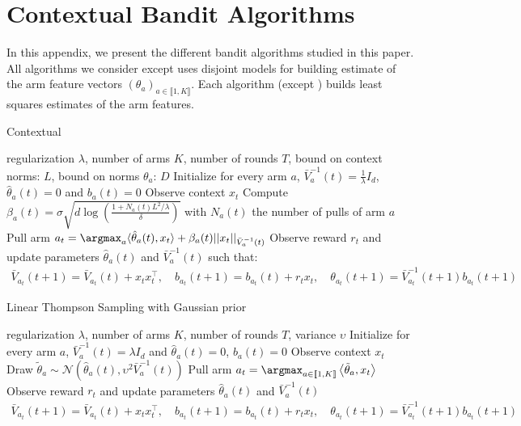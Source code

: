 \section{Contextual Bandit Algorithms}\label{app:algorithms}

In this appendix, we present the different bandit algorithms studied in this paper. All algorithms we consider except \expfour uses disjoint models for building estimate of the arm feature vectors $(\theta_{a})_{a\in\llbracket 1, K\rrbracket}$. Each algorithm (except \expfour) builds least squares estimates of the arm features.

\begin{algorithm}[h]
  \caption{Contextual \linucb}
  \label{alg:linucb}
\begin{algorithmic}
   regularization  $\lambda$, number of arms $K$, number of rounds $T$, bound on context norms: $L$, bound on norms $\theta_{a}$: $D$
  \STATE Initialize for every arm $a$, $\bar{V}_{a}^{-1}(t) = \frac1\lambda I_{d}$, $\hat{\theta}_{a}(t) = 0$ and $b_{a}(t) = 0$
  \STATE Observe context $x_{t}$
  \STATE Compute $\beta_{a}(t) = \sigma\sqrt{d\log\left(\frac{1 +  N_{a}(t)L^{2}/\lambda}{\delta}\right)}$ with $N_{a}(t)$ the number of pulls of arm $a$
  \STATE Pull arm  $a_{t} =\argmax_a \langle \hat{\theta}_{a}(t),x_t\rangle + \beta_{a}(t)||x_{t}||_{\bar{V}_{a}^{-1}(t)}$
  \STATE Observe reward $r_{t}$ and update parameters $\hat{\theta}_{a}(t)$ and $\bar{V}_{a}^{-1}(t)$ such that:
  \begin{align*}
      \bar{V}_{a_{t}}(t+1) = \bar{V}_{a_{t}}(t) + x_{t}x_{t}^{\intercal},\quad b_{a_{t}}(t+1) = b_{a_{t}}(t) + r_{t}x_{t},\quad\theta_{a_{t}}(t+1) = \bar{V}_{a_{t}}^{-1}(t+1)b_{a_{t}}(t+1)
  \end{align*}
  \ENDFOR
\end{algorithmic}
\end{algorithm}

\begin{algorithm}[h]
  \caption{Linear Thompson Sampling with Gaussian prior}
  \label{alg:linTS}
\begin{algorithmic}
   regularization  $\lambda$, number of arms $K$, number of rounds $T$, variance $\upsilon$
  \STATE Initialize for every arm $a$, $\bar{V}_{a}^{-1}(t) = \lambda I_{d}$ and $\hat{\theta}_{a}(t) = 0$, $b_{a}(t) = 0$
  \STATE Observe context $x_{t}$
  \STATE Draw $\tilde{\theta}_{a}\sim\mathcal{N}(\hat{\theta}_{a}(t), \upsilon^{2}\bar{V}_{a}^{-1}(t))$
  \STATE Pull arm $a_{t} = \argmax_{a\in \llbracket 1, K\rrbracket} \left\langle \tilde{\theta}_{a}, x_{t}\right\rangle$
  \STATE Observe reward $r_{t}$ and update parameters $\hat{\theta}_{a}(t)$ and $\bar{V}_{a}^{-1}(t)$
    \begin{align*}
      \bar{V}_{a_{t}}(t+1) = \bar{V}_{a_{t}}(t) + x_{t}x_{t}^{\intercal},\quad b_{a_{t}}(t+1) = b_{a_{t}}(t) + r_{t}x_{t},\quad\theta_{a_{t}}(t+1) = \bar{V}_{a_{t}}^{-1}(t+1)b_{a_{t}}(t+1)
  \end{align*}
  \ENDFOR
\end{algorithmic}
\end{algorithm}


